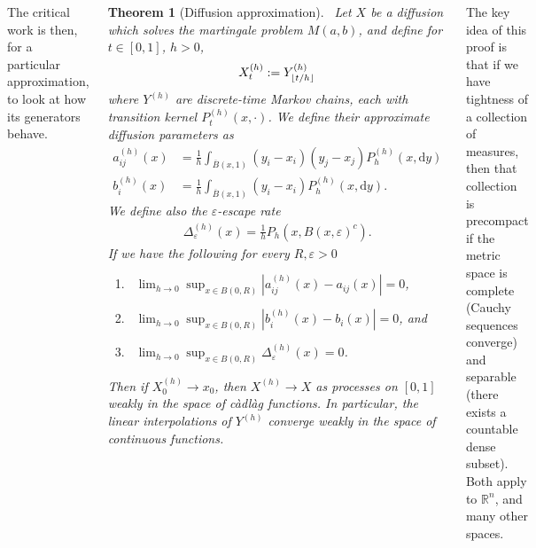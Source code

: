 \documentclass{tikzposter} %
\DeclarePairedDelimiter{\floor}{\lfloor}{\rfloor}
\newtheorem{theorem}{Theorem}
\begin{document}
\begin{columns}
{    The critical work is then, for a particular approximation, to look at how its generators behave. \\

    \begin{theorem}[Diffusion approximation]
      \ Let $X$ be a diffusion which solves the martingale problem $M(a, b)$, and define for $t \in [0,1]$, $h > 0$,
      \begin{align*}
        X^{(h)}_t := Y^{(h)}_{\floor{t/h}}
      \end{align*}
      where $Y^{(h)}$ are discrete-time Markov chains, each with transition kernel $P^{(h)}_t(x, \cdot)$. We define their approximate diffusion parameters as 
      \begin{align*}
        a^{(h)}_{ij}(x) &= \frac{1}{h}\int_{\overline{B}(x, 1)} (y_i - x_i)(y_j - x_j) P^{(h)}_h(x, \mathrm{d}y) \\
        b^{(h)}_i(x) &= \frac{1}{h} \int_{\overline{B}(x, 1)} (y_i - x_i) P^{(h)}_h(x, \mathrm{d}y).
      \end{align*}
      We define also the $\varepsilon$-escape rate
      \begin{align*}
        \Delta^{(h)}_{\varepsilon}(x) = \frac{1}{h} P_h(x, B(x, \varepsilon)^c).
      \end{align*}
      If we have the following for every $R, \varepsilon > 0$
      \begin{enumerate}[label=(\roman*)]
              \item \ $\displaystyle \lim_{h \to 0} \sup_{x \in B(0, R)} |a^{(h)}_{ij}(x) - a_{ij}(x)| = 0$,
              \item \ $\displaystyle \lim_{h \to 0} \sup_{x \in B(0, R)} |b_i^{(h)}(x) - b_i(x)| = 0$, and
              \item \ $\displaystyle \lim_{h \to 0} \sup_{x \in B(0, R)} \Delta_{\varepsilon}^{(h)}(x) = 0$.
      \end{enumerate}
      Then if $X^{(h)}_0 \to x_0$, then $X^{(h)} \to X$ as processes on $[0, 1]$ weakly in the space of c\`adl\`ag functions. In particular, the linear interpolations of $Y^{(h)}$ converge weakly in the space of continuous functions.
    \end{theorem}
    \hphantom{}

    The key idea of this proof is that if we have tightness of a collection of measures, then that collection is precompact if the metric space is complete (Cauchy sequences converge) and separable (there exists a countable dense subset). Both apply to $\mathbb{R}^n$, and many other spaces. \\

}
\end{columns}
\end{document}
